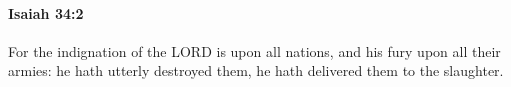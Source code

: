 
		\paragraph{Isaiah 34:2} %
			\label{ISAIAH-34-2}

			For the indignation of the LORD is upon all nations, and his fury upon all their armies: he hath utterly destroyed them, he hath delivered them to the slaughter.


